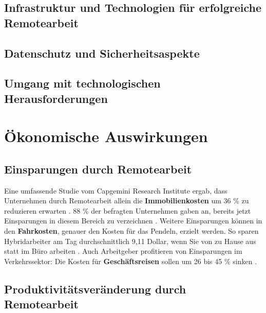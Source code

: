 \documentclass[runningheads]{llncs}
\begin{document}
\subsection{Infrastruktur und Technologien für erfolgreiche Remotearbeit}

\subsection{Datenschutz und Sicherheitsaspekte}

\subsection{Umgang mit technologischen Herausforderungen}


\section{Ökonomische Auswirkungen}


\subsection{Einsparungen durch Remotearbeit}

Eine umfassende Studie vom Capgemini Research Institute ergab, dass Unternehmen durch Remotearbeit allein die \textbf{Immobilienkosten} um 36 \% zu reduzieren erwarten \cite{capgemini_research_institute_future_2020}.
88 \% der befragten Unternehmen gaben an, bereits jetzt Einsparungen in diesem Bereich zu verzeichnen \cite{capgemini_research_institute_future_2020}.
Weitere Einsparungen können in den \textbf{Fahrkosten}, genauer den Kosten für das Pendeln, erzielt werden.
So sparen Hybridarbeiter am Tag durchschnittlich 9,11 Dollar, wenn Sie von zu Hause aus statt im Büro arbeiten \cite{owl_labs_state_2022}.
Auch Arbeitgeber profitieren von Einsparungen im Verkehrssektor:
Die Kosten für \textbf{Geschäftsreisen} sollen um 26 bis 45 \% sinken \cite{capgemini_research_institute_future_2020}.

\subsection{Produktivitätsveränderung durch Remotearbeit}
\end{document}

